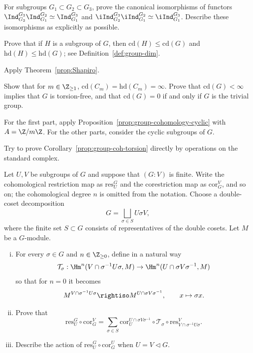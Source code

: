 \begin{Exercises}
	\item For subgroups $G_1\subset G_2\subset G_3$, prove the canonical
	isomorphisms of functors
	$\Ind^{G_3}_{G_2}\Ind^{G_2}_{G_1}\simeq\Ind^{G_3}_{G_1}$ and
	$\iInd^{G_3}_{G_2}\iInd^{G_2}_{G_1}\simeq\iInd^{G_3}_{G_1}$.
	Describe these isomorphisms as explicitly as possible.

	\item Prove that if $H$ is a subgroup of $G$, then
	$\mathrm{cd}(H)\leq\mathrm{cd}(G)$ and
	$\mathrm{hd}(H)\leq\mathrm{hd}(G)$; see
	Definition~\ref{def:group-dim}.
	\begin{hint}
		Apply Theorem~\ref{prop:Shapiro}.
	\end{hint}

	\item Show that for $m\in\Z_{\geq1}$,
	$\mathrm{cd}(C_m)=\mathrm{hd}(C_m)=\infty$. Prove that
	$\mathrm{cd}(G)<\infty$ implies that $G$ is torsion-free, and that
	$\mathrm{cd}(G)=0$ if and only if $G$ is the trivial group.
	\begin{hint}
		For the first part, apply
		Proposition~\ref{prop:group-cohomology-cyclic} with $A=\Z/m\Z$.
		For the other parts, consider the cyclic subgroups of $G$.
	\end{hint}

	\item Try to prove Corollary~\ref{prop:group-coh-torsion} directly by
	operations on the standard complex.

	\item Let $U,V$ be subgroups of $G$ and suppose that $(G:V)$ is finite.
	Write the cohomological restriction map as $\mathrm{res}^G_U$ and the
	corestriction map as $\mathrm{cor}^V_G$, and so on; the cohomological
	degree $n$ is omitted from the notation. Choose a double-coset
	decomposition
	\[ G=\bigsqcup_{\sigma\in S}U\sigma V, \]
	where the finite set $S\subset G$ consists of representatives of the
	double cosets. Let $M$ be a $G$-module.
	\begin{enumerate}[(i)]
		\item For every $\sigma\in G$ and $n\in\Z_{\geq0}$, define in a
		natural way
		\[ \mathcal{T}_\sigma:
		\Hm^n(V\cap\sigma^{-1}U\sigma,M)
		\to\Hm^n(U\cap\sigma V\sigma^{-1},M) \]
		so that for $n=0$ it becomes
		\[ M^{V\cap\sigma^{-1}U\sigma}\rightiso
		M^{U\cap\sigma V\sigma^{-1}},\qquad x\mapsto\sigma x. \]
		\item Prove that
		\[ \mathrm{res}^G_U\circ\mathrm{cor}^V_G
		=\sum_{\sigma\in S}
		\mathrm{cor}^{U\cap\sigma V\sigma^{-1}}_U
		\circ\mathcal{T}_\sigma
		\circ\mathrm{res}^V_{V\cap\sigma^{-1}U\sigma}. \]
		\item Describe the action of
		$\mathrm{res}^G_U\circ\mathrm{cor}^U_G$ when $U=V\lhd G$.
	\end{enumerate}


\end{Exercises}
